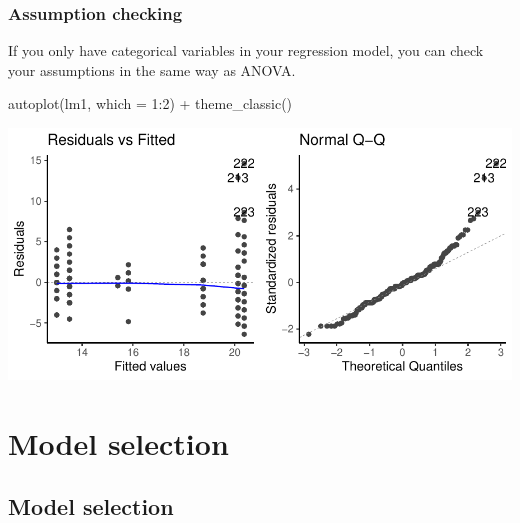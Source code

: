 \documentclass[a4paper]{article}\usepackage[]{graphicx}\usepackage[]{xcolor}
\makeatletter
\def\maxwidth{ %
  \ifdim\Gin@nat@width>\linewidth
    \linewidth
  \else
    \Gin@nat@width
  \fi
}
\makeatother
\begin{document}
\subsubsection{Assumption checking}
If you only have categorical variables in your regression model, you can check your assumptions in the same way as ANOVA.
\begin{Schunk}
\begin{Sinput}
autoplot(lm1, which = 1:2) + theme_classic()
\end{Sinput}


{\centering \includegraphics[width=\maxwidth]{figure/listings-unnamed-chunk-385-1} 

}

\end{Schunk}
\section{Model selection}\label{sec:29}
\subsection{Model selection}
\end{document}
